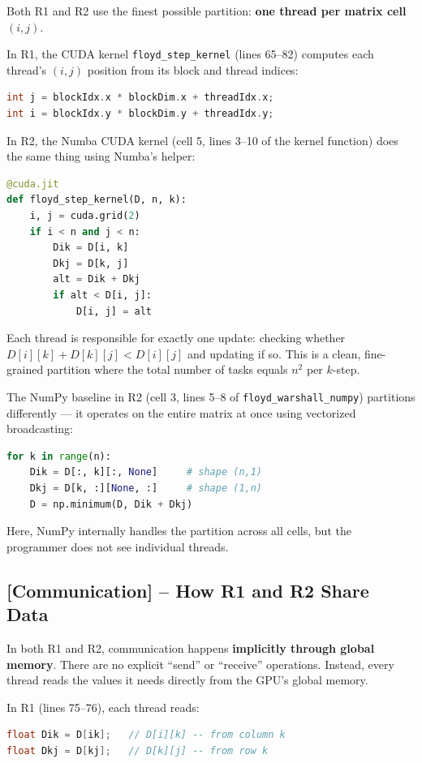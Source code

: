 \documentclass[11pt]{article}
\begin{document}
Both R1 and R2 use the finest possible partition: \textbf{one thread per matrix cell $(i, j)$}.

In R1, the CUDA kernel \texttt{floyd\_step\_kernel} (lines 65--82) computes each thread's $(i, j)$ position from its block and thread indices:
\begin{lstlisting}[language=C++]
int j = blockIdx.x * blockDim.x + threadIdx.x;
int i = blockIdx.y * blockDim.y + threadIdx.y;
\end{lstlisting}

In R2, the Numba CUDA kernel (cell 5, lines 3--10 of the kernel function) does the same thing using Numba's helper:
\begin{lstlisting}[language=Python]
@cuda.jit
def floyd_step_kernel(D, n, k):
    i, j = cuda.grid(2)
    if i < n and j < n:
        Dik = D[i, k]
        Dkj = D[k, j]
        alt = Dik + Dkj
        if alt < D[i, j]:
            D[i, j] = alt
\end{lstlisting}

Each thread is responsible for exactly one update: checking whether $D[i][k] + D[k][j] < D[i][j]$ and updating if so. This is a clean, fine-grained partition where the total number of tasks equals $n^2$ per $k$-step.

The NumPy baseline in R2 (cell 3, lines 5--8 of \texttt{floyd\_warshall\_numpy}) partitions differently --- it operates on the entire matrix at once using vectorized broadcasting:
\begin{lstlisting}[language=Python]
for k in range(n):
    Dik = D[:, k][:, None]     # shape (n,1)
    Dkj = D[k, :][None, :]     # shape (1,n)
    D = np.minimum(D, Dik + Dkj)
\end{lstlisting}
Here, NumPy internally handles the partition across all cells, but the programmer does not see individual threads.

\subsection*{[Communication] -- How R1 and R2 Share Data}

In both R1 and R2, communication happens \textbf{implicitly through global memory}. There are no explicit ``send'' or ``receive'' operations. Instead, every thread reads the values it needs directly from the GPU's global memory.

In R1 (lines 75--76), each thread reads:
\begin{lstlisting}[language=C++]
float Dik = D[ik];   // D[i][k] -- from column k
float Dkj = D[kj];   // D[k][j] -- from row k
\end{lstlisting}
\end{document}

